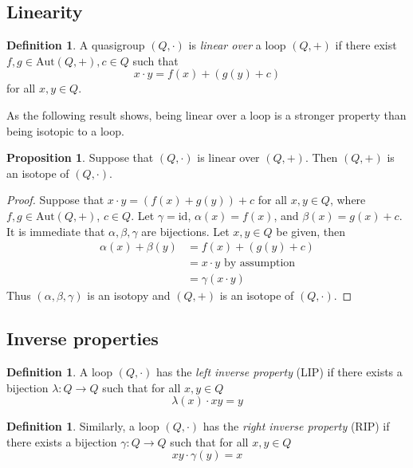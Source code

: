 \documentclass[12pt, twoside, openright]{report}
\theoremstyle{definition}
\newtheorem{prp}[thm]{Proposition}
\newtheorem{dfn}[thm]{Definition}
\newcommand{\aut}{\mathrm{Aut}}     %
\newcommand{\id}{\mathrm{id}}       %
\begin{document}
\subsection{Linearity}

\begin{dfn}
  A quasigroup $(Q, \cdot)$ is \emph{linear over} a loop $(Q, +)$ if there exist $f, g\in \aut(Q, +), c\in Q$ such that
  \[x\cdot y = f(x) + (g(y) + c)\]
  for all $x, y\in Q$.
\end{dfn}

As the following result shows, being linear over a loop is a stronger property than being isotopic to a loop.

\begin{prp}\label{prp-linear-iso}
  Suppose that $(Q, \cdot)$ is linear over $(Q, +)$. Then $(Q, +)$ is an isotope of $(Q, \cdot)$.
\end{prp}

\begin{proof}
  Suppose that $x\cdot y = (f(x) + g(y)) + c$ for all $x, y\in Q$, where $f, g\in \aut(Q, +)$, $c\in Q$. Let $\gamma = \id$,
    $\alpha(x) = f(x)$, and $\beta(x) = g(x) + c$. It is immediate that $\alpha, \beta, \gamma$ are bijections.
    Let $x, y\in Q$ be given, then
  \begin{align*}
    \alpha(x) + \beta(y) &= f(x) + (g(y) + c)\\
    &= x\cdot y\text{ by assumption}\\
    &= \gamma(x\cdot y)
  \end{align*}
  Thus $(\alpha, \beta, \gamma)$ is an isotopy and $(Q, +)$ is an isotope of $(Q, \cdot)$.
\end{proof}

\subsection{Inverse properties}

\begin{dfn}
  A loop $(Q, \cdot)$ has the \emph{left inverse property} (LIP) if there exists a bijection $\lambda: Q\to Q$ such
    that for all $x, y\in Q$
  \[\lambda(x)\cdot xy = y\]
\end{dfn}

\begin{dfn}
  Similarly, a loop $(Q, \cdot)$ has the \emph{right inverse property} (RIP) if there exists a bijection $\gamma: Q\to Q$
    such that for all $x, y\in Q$
  \[xy\cdot \gamma(y) = x\]
\end{dfn}
\end{document}
